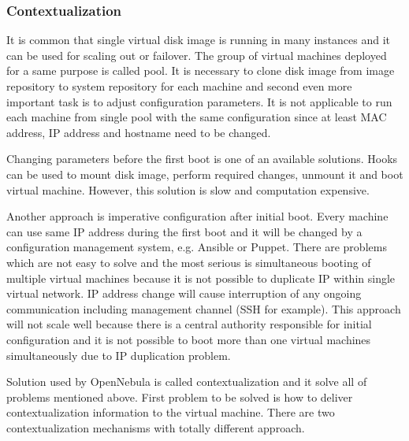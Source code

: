 \subsubsection{Contextualization}
It is common that single virtual disk image is running in many instances and it can be used for scaling out or failover. The group of virtual machines deployed for a same purpose is called pool. It is necessary to clone disk image from image repository to system repository for each machine and second even more important task is to adjust configuration parameters. It is not applicable to run each machine from single pool with the same configuration since at least \Ac{MAC} address, \Ac{IP} address and hostname need to be changed.

Changing parameters before the first boot is one of an available solutions. Hooks can be used to mount disk image, perform required changes, unmount it and boot virtual machine. However, this solution is slow and computation expensive.

Another approach is imperative configuration after initial boot. Every machine can use same \Ac{IP} address during the first boot and it will be changed by a configuration management system, e.g. Ansible or Puppet. There are problems which are not easy to solve and the most serious is simultaneous booting of multiple virtual machines because it is not possible to duplicate \Ac{IP} within single virtual network. \Ac{IP} address change will cause interruption of any ongoing communication including management channel (\Ac{SSH} for example). This approach will not scale well because there is a central authority responsible for initial configuration and it is not possible to boot more than one virtual machines simultaneously due to \Ac{IP} duplication problem.

Solution used by OpenNebula is called contextualization and it solve all of problems mentioned above. First problem to be solved is how to deliver contextualization information to the virtual machine. There are two contextualization mechanisms with totally different approach.

